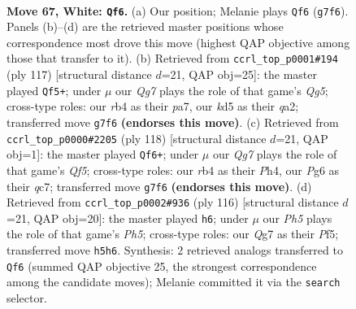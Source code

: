 \documentclass[11pt]{article}
\begin{document}
\clearpage

\begin{figure}[p]\centering
\begin{subfigure}{0.46\textwidth}\centering
\resizebox{\linewidth}{!}{%
\newchessgame
\chessboard[
  setfen={8/6Q1/6P1/3kP2P/1r6/8/2K5/8 w - - 1 67},
  showmover=false,
  pgfstyle=straightmove, color=movearrow, markmove={g7-f6}
]}
\caption{}
\end{subfigure}\hfill
\begin{subfigure}{0.46\textwidth}\centering
\resizebox{\linewidth}{!}{%
\newchessgame
\chessboard[
  setfen={8/P7/5pk1/3K4/2p3q1/8/Q7/8 b - - 12 59},
  showmover=false,
  pgfstyle=straightmove, color=movearrow, markmove={g4-f5}
]}
\caption{}
\end{subfigure}
\\[4pt]
\begin{subfigure}{0.46\textwidth}\centering
\resizebox{\linewidth}{!}{%
\newchessgame
\chessboard[
  setfen={7k/2q5/8/5Q2/7P/6PK/8/8 w - - 1 60},
  showmover=false,
  pgfstyle=straightmove, color=movearrow, markmove={f5-f6}
]}
\caption{}
\end{subfigure}\hfill
\begin{subfigure}{0.46\textwidth}\centering
\resizebox{\linewidth}{!}{%
\newchessgame
\chessboard[
  setfen={8/8/3kPK2/5P1P/8/8/8/6r1 w - - 1 59},
  showmover=false,
  pgfstyle=straightmove, color=movearrow, markmove={h5-h6}
]}
\caption{}
\end{subfigure}
\caption{\textbf{Move 67, White: \texttt{Qf6}.} (a) Our position; Melanie plays \texttt{Qf6} (\texttt{g7f6}). Panels (b)--(d) are the retrieved master positions whose correspondence most drove this move (highest QAP objective among those that transfer to it). (b) Retrieved from \texttt{ccrl\_top\_p0001\#194} (ply 117) [structural distance $d$=21, QAP obj=25]: the master played \texttt{Qf5+}; under $\mu$ our \emph{Qg7} plays the role of that game's \emph{Qg5}; cross-type roles: our \emph{r}b4 as their \emph{p}a7, our \emph{k}d5 as their \emph{q}a2; transferred move \texttt{g7f6} \textbf{(endorses this move)}. (c) Retrieved from \texttt{ccrl\_top\_p0000\#2205} (ply 118) [structural distance $d$=21, QAP obj=1]: the master played \texttt{Qf6+}; under $\mu$ our \emph{Qg7} plays the role of that game's \emph{Qf5}; cross-type roles: our \emph{r}b4 as their \emph{P}h4, our \emph{P}g6 as their \emph{q}c7; transferred move \texttt{g7f6} \textbf{(endorses this move)}. (d) Retrieved from \texttt{ccrl\_top\_p0002\#936} (ply 116) [structural distance $d$=21, QAP obj=20]: the master played \texttt{h6}; under $\mu$ our \emph{Ph5} plays the role of that game's \emph{Ph5}; cross-type roles: our \emph{Q}g7 as their \emph{P}f5; transferred move \texttt{h5h6}. Synthesis: 2 retrieved analogs transferred to \texttt{Qf6} (summed QAP objective 25, the strongest correspondence among the candidate moves); Melanie committed it via the \texttt{search} selector.}
\label{fig:thought-m132}
\end{figure}
\end{document}
